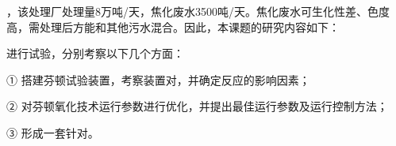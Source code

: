，该处理厂处理量8万吨/天，焦化废水3500吨/天。焦化废水可生化性差、色度高，需处理后方能和其他污水混合。因此，本课题的研究内容如下：\par
进行试验，分别考察以下几个方面：\par
① 搭建芬顿试验装置，考察装置对，并确定反应的影响因素；\par
② 对芬顿氧化技术运行参数进行优化，并提出最佳运行参数及运行控制方法；\par
③ 形成一套针对。\par
